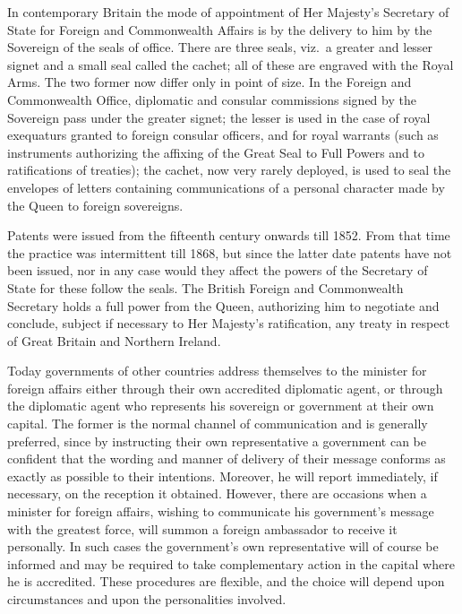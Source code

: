 \documentclass[
  openany]{book}
\begin{document}
In contemporary Britain the mode of appointment of Her Majesty's Secretary of State for Foreign and Commonwealth Affairs is by the delivery to him by the Sovereign of the seals of office. There are three seals, viz.~a greater and lesser signet and a small seal called the cachet; all of these are engraved with the Royal Arms. The two former now differ only in point of size. In the Foreign and Commonwealth Office, diplomatic and consular commissions signed by the Sovereign pass under the greater signet; the lesser is used in the case of royal exequaturs granted to foreign consular officers, and for royal warrants (such as instruments authorizing the affixing of the Great Seal to Full Powers and to ratifications of treaties); the cachet, now very rarely deployed, is used to seal the envelopes of letters containing communications of a personal character made by the Queen to foreign sovereigns.

Patents were issued from the fifteenth century onwards till 1852. From that time the practice was intermittent till 1868, but since the latter date patents have not been issued, nor in any case would they affect the powers of the Secretary of State for these follow the seals. The British Foreign and Commonwealth Secretary holds a full power from the Queen, authorizing him to negotiate and conclude, subject if necessary to Her Majesty's ratification, any treaty in respect of Great Britain and Northern Ireland.

Today governments of other countries address themselves to the minister for foreign affairs either through their own accredited diplomatic agent, or through the diplomatic agent who represents his sovereign or government at their own capital. The former is the normal channel of communication and is generally preferred, since by instructing their own representative a government can be confident that the wording and manner of delivery of their message conforms as exactly as possible to their intentions. Moreover, he will report immediately, if necessary, on the reception it obtained. However, there are occasions when a minister for foreign affairs, wishing to communicate his government's message with the greatest force, will summon a foreign ambassador to receive it personally. In such cases the government's own representative will of course be informed and may be required to take complementary action in the capital where he is accredited. These procedures are flexible, and the choice will depend upon circumstances and upon the personalities involved.
\end{document}
